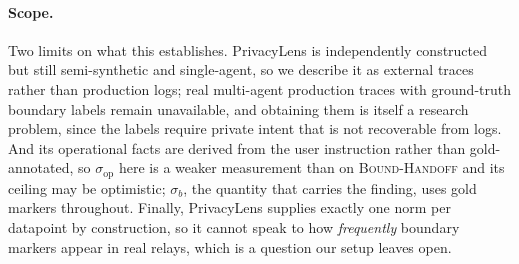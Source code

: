 \paragraph{Scope.} Two limits on what this establishes. PrivacyLens is independently constructed but still semi-synthetic and single-agent, so we describe it as external traces rather than production logs; real multi-agent production traces with ground-truth boundary labels remain unavailable, and obtaining them is itself a research problem, since the labels require private intent that is not recoverable from logs. And its operational facts are derived from the user instruction rather than gold-annotated, so $\sigma_{\mathrm{op}}$ here is a weaker measurement than on \textsc{Bound-Handoff} and its ceiling may be optimistic; $\sigma_b$, the quantity that carries the finding, uses gold markers throughout. Finally, PrivacyLens supplies exactly one norm per datapoint by construction, so it cannot speak to how \emph{frequently} boundary markers appear in real relays, which is a question our setup leaves open.
